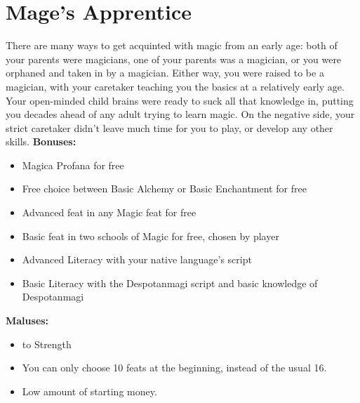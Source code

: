 \section{Mage's Apprentice}
There are many ways to get acquinted with magic from an early age: both of your parents were magicians, one of your parents was a magician, or you were orphaned and taken in by a magician. Either way, you were raised to be a magician, with your caretaker teaching you the basics at a relatively early age. Your open-minded child brains were ready to suck all that knowledge in, putting you decades ahead of any adult trying to learn magic. On the negative side, your strict caretaker didn't leave much time for you to play, or develop any other skills.\newline
\textbf{Bonuses:}
\begin{itemize}
	\item Magica Profana for free
	\item Free choice between Basic Alchemy or Basic Enchantment for free
	\item Advanced feat in any Magic feat  for free
	\item Basic feat in two schools of Magic for free, chosen by player
	\item Advanced Literacy with your native language's script
	\item Basic Literacy with the Despotanmagi script and basic knowledge of Despotanmagi 
\end{itemize}
\textbf{Maluses:}
\begin{itemize}
	\item {} to Strength
	\item You can only choose 10 feats at the beginning, instead of the usual 16.
	\item Low amount of starting money.
\end{itemize}
